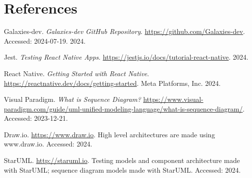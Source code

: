 \section{References}

\begin{enumerate}[label={[}\arabic*{]}]
    \item Galaxies-dev. \textit{Galaxies-dev GitHub Repository}. \url{https://github.com/Galaxies-dev}. Accessed: 2024-07-19. 2024.
    \item Jest. \textit{Testing React Native Apps}. \url{https://jestjs.io/docs/tutorial-react-native}. 2024.
    \item React Native. \textit{Getting Started with React Native}. \url{https://reactnative.dev/docs/getting-started}. Meta Platforms, Inc. 2024.
    \item Visual Paradigm. \textit{What is Sequence Diagram?} \url{https://www.visual-paradigm.com/guide/uml-unified-modeling-language/what-is-sequence-diagram/}. Accessed: 2023-12-21.
    \item Draw.io. \url{https://www.draw.io}. High level architectures are made using www.draw.io. Accessed: 2024.
    \item StarUML. \url{http://staruml.io}. Testing models and component architecture made with StarUML; sequence diagram models made with StarUML. Accessed: 2024.
\end{enumerate}